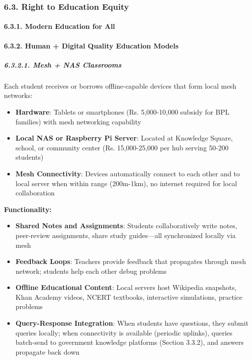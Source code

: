 \subsubsection{6.3. Right to Education
Equity}\label{right-to-education-equity}

\paragraph{6.3.1. Modern Education for
All}\label{modern-education-for-all}

\paragraph{6.3.2. Human + Digital Quality Education
Models}\label{human-digital-quality-education-models}

\subparagraph{6.3.2.1. Mesh + NAS Classrooms}\label{mesh-nas-classrooms}

Each student receives or borrows offline-capable devices that form local
mesh networks:

\begin{itemize}
\tightlist
\item
  \textbf{Hardware}: Tablets or smartphones (Rs. 5,000-10,000 subsidy
  for BPL families) with mesh networking capability
\item
  \textbf{Local NAS or Raspberry Pi Server}: Located at Knowledge
  Square, school, or community center (Rs. 15,000-25,000 per hub serving
  50-200 students)
\item
  \textbf{Mesh Connectivity}: Devices automatically connect to each
  other and to local server when within range (200m-1km), no internet
  required for local collaboration
\end{itemize}

\textbf{Functionality:}

\begin{itemize}
\tightlist
\item
  \textbf{Shared Notes and Assignments}: Students collaboratively write
  notes, peer-review assignments, share study guides---all synchronized
  locally via mesh
\item
  \textbf{Feedback Loops}: Teachers provide feedback that propagates
  through mesh network; students help each other debug problems
\item
  \textbf{Offline Educational Content}: Local servers host Wikipedia
  snapshots, Khan Academy videos, NCERT textbooks, interactive
  simulations, practice problems
\item
  \textbf{Query-Response Integration}: When students have questions,
  they submit queries locally; when connectivity is available (periodic
  uplinks), queries batch-send to government knowledge platforms
  (Section 3.3.2), and answers propagate back down
\end{itemize}

